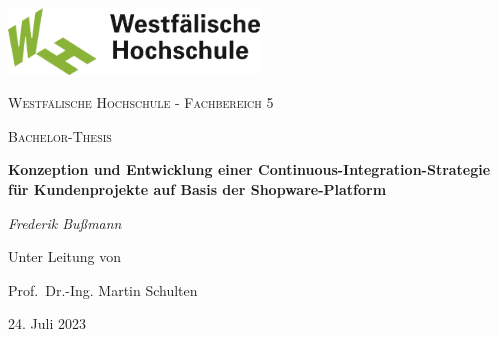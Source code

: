 
\begin{titlepage}
    \centering
    \includegraphics[width=0.5\textwidth]{images/w-hs}\par\vspace{1cm}
    \vspace{1cm}
    {\scshape\Large Westfälische Hochschule - Fachbereich 5\par}
    \vspace{0.75cm}
    {\scshape\Large Bachelor-Thesis\par}
    \vfill
    {\Large\textbf{Konzeption und Entwicklung einer Continuous-Integration-Strategie für Kundenprojekte auf Basis der
    Shopware-Platform}\par}
    \vspace{0.5cm}
    {\Large\itshape Frederik Bußmann\par}
    \vfill
    Unter Leitung von\par
    Prof.\ Dr.-Ing. Martin Schulten\\
    \vspace{1cm}
    {\large 24. Juli 2023\par}
\end{titlepage}
\clearpage

\afterpage{\blankpage}
\clearpage